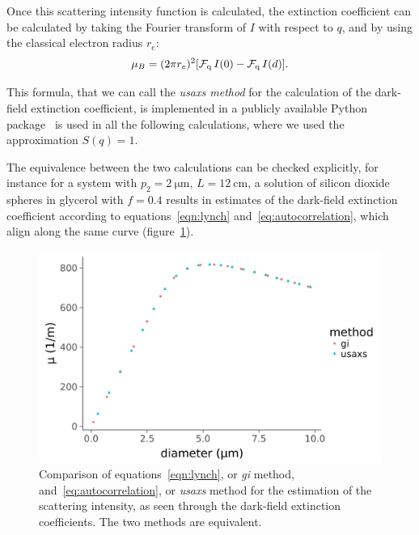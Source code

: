 Once this scattering intensity function is calculated, the extinction
coefficient can be calculated by taking the Fourier transform of $I$ with respect
to $q$, and by using the classical electron radius $r_e$:
\begin{equation}
\mu_B = (2 \pi r_e)^2 [\operatorname{\mathcal{F}_{q}} I(0) - \operatorname{\mathcal{F}_{q}} I(d)].
    \label{eq:autocorrelation}
\end{equation}

This formula, that we can call the \emph{usaxs method} for the
calculation of the dark-field extinction coefficient, is implemented in a publicly available Python
package~\parencite{scattering-repository}
is used in all the following calculations, where we used the approximation
$S(q) = 1$.

The equivalence between the two calculations can be checked explicitly, for
instance for a system with $p_2 = \SI{2}{\micro\meter}$, $L =
\SI{12}{\centi\meter}$, a solution of silicon dioxide spheres in glycerol
with $f = 0.4$ results in estimates of the dark-field extinction coefficient
according to equations~\eqref{eqn:lynch} and~\eqref{eq:autocorrelation},
which align along the same curve (figure~\ref{fig:equivalence-lynch-saxs}).

\begin{figure}[ht]
    \centering
    \includegraphics[width=\columnwidth]{gfx/lynch-vs-saxs/plot.png}
    \caption[Equivalence of grating interferometry and small-angle
        scattering approaches for the calculation of dark-field extinction
    coefficients.]{Comparison of equations~\eqref{eqn:lynch}, or \emph{gi} method,
    and~\eqref{eq:autocorrelation}, or \emph{usaxs} method for the
estimation of the scattering intensity, as seen through the dark-field
extinction coefficients. The two methods are equivalent.}
    \label{fig:equivalence-lynch-saxs}
\end{figure}

